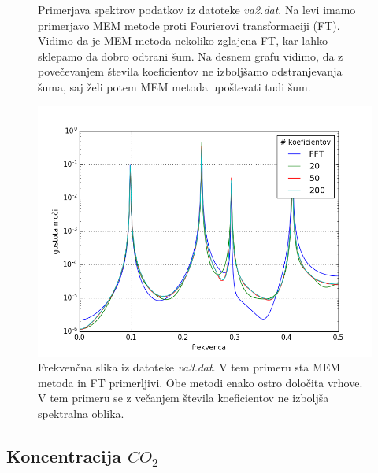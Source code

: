 \documentclass[slovene,11pt,a4paper]{article}
\numberwithin{equation}{section} %
\numberwithin{figure}{section} %
\numberwithin{table}{section} %
\begin{document}
\begin{figure}[!htb]
\caption{Primerjava spektrov podatkov iz datoteke \textsl{va2.dat}. Na levi imamo primerjavo MEM metode proti Fourierovi transformaciji (FT). Vidimo da je MEM metoda nekoliko zglajena FT, kar lahko sklepamo da dobro odtrani šum. Na desnem grafu vidimo, da z povečevanjem števila koeficientov ne izboljšamo odstranjevanja šuma, saj želi potem MEM metoda upoštevati tudi šum. }
\end{figure}



\begin{figure}[!hbt]
\centering
\includegraphics[scale=0.5]{slike/val3_primerjava_koef.png}
\caption{Frekvenčna slika iz datoteke \textsl{va3.dat}. V tem primeru sta MEM metoda in FT primerljivi. Obe metodi enako ostro določita vrhove. V tem primeru se z večanjem števila koeficientov ne izboljša spektralna oblika.}
\end{figure}

\FloatBarrier

\subsection{Koncentracija $CO_2$}
\end{document}
